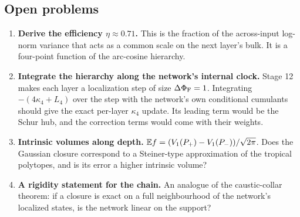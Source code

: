 \subsection{Open problems}
\begin{enumerate}[leftmargin=*]
\item \textbf{Derive the efficiency $\eta\approx0.71$.} This is the fraction of the across-input log-norm variance that acts as a common
scale on the next layer's bulk. It is a four-point function of the arc-cosine hierarchy.
\item \textbf{Integrate the hierarchy along the network's internal clock.} Stage 12 makes each layer a localization step of size
$\Delta\Phi_{\mathrm F}=1$. Integrating $-(4\kappa_4+L_4)$ over the step with the network's own conditional cumulants should give the exact per-layer
$\kappa_4$ update. Its leading term would be the Schur hub, and the correction terms would come with their weights.
\item \textbf{Intrinsic volumes along depth.} $\mathbb E f=(V_1(P_+)-V_1(P_-))/\sqrt{2\pi}$. Does the Gaussian closure correspond to a
Steiner-type approximation of the tropical polytopes, and is its error a higher intrinsic volume?
\item \textbf{A rigidity statement for the chain.} An analogue of the caustic-collar theorem: if a closure is exact on a full
neighbourhood of the network's localized states, is the network linear on the support?
\end{enumerate}
